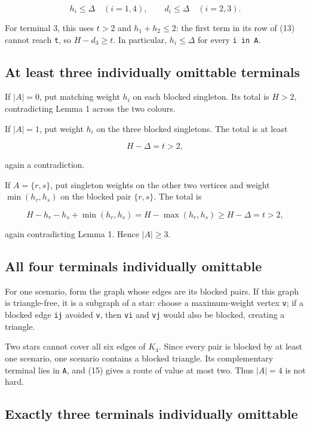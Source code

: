 \documentclass[
  11pt,
]{article}
\begin{document}
\[
h_i\le\Delta\quad(i=1,4),
\qquad
d_i\le\Delta\quad(i=2,3).
\tag{18}
\]

For terminal 3, this uses \(t>2\) and \(h_1+h_2\le2\): the first term in
its row of (13) cannot reach \texttt{t}, so \(H-d_3\ge t\). In
particular, \(h_i\le\Delta\) for every \texttt{i\ in\ A}.

\subsection{At least three individually omittable
terminals}\label{at-least-three-individually-omittable-terminals}

If \(|A|=0\), put matching weight \(h_i\) on each blocked singleton. Its
total is \(H>2\), contradicting Lemma 1 across the two colours.

If \(|A|=1\), put weight \(h_i\) on the three blocked singletons. The
total is at least

\[
H-\Delta=t>2,
\]

again a contradiction.

If \(A=\{r,s\}\), put singleton weights on the other two vertices and
weight \(\min(h_r,h_s)\) on the blocked pair \(\{r,s\}\). The total is

\[
H-h_r-h_s+\min(h_r,h_s)
=H-\max(h_r,h_s)
\ge H-\Delta=t>2,
\]

again contradicting Lemma 1. Hence \(|A|\ge3\).

\subsection{All four terminals individually
omittable}\label{all-four-terminals-individually-omittable}

For one scenario, form the graph whose edges are its blocked pairs. If
this graph is triangle-free, it is a subgraph of a star: choose a
maximum-weight vertex \texttt{v}; if a blocked edge \texttt{ij} avoided
\texttt{v}, then \texttt{vi} and \texttt{vj} would also be blocked,
creating a triangle.

Two stars cannot cover all six edges of \(K_4\). Since every pair is
blocked by at least one scenario, one scenario contains a blocked
triangle. Its complementary terminal lies in \texttt{A}, and (15) gives
a route of value at most two. Thus \(|A|=4\) is not hard.

\subsection{Exactly three terminals individually
omittable}\label{exactly-three-terminals-individually-omittable}
\end{document}
